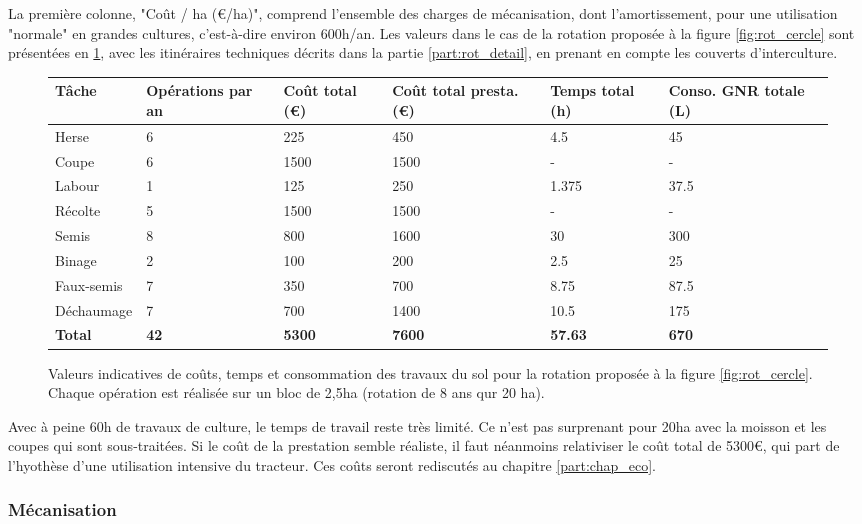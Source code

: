 \documentclass{book}
\begin{document}
La première colonne, "Coût / ha (\euro{}/ha)", comprend l'ensemble des charges de mécanisation, dont l'amortissement, pour une utilisation "normale" en grandes cultures, c'est-à-dire environ 600h/an. Les valeurs dans le cas de la rotation proposée à la figure \ref{fig:rot_cercle} sont présentées en \ref{tab:W_sol2}, avec les itinéraires techniques décrits dans la partie \ref{part:rot_detail}, en prenant en compte les couverts d'interculture.

\begin{figure}[h!]
\footnotesize
\center
\begin{tabular}{ | p{} | p{}| p{2cm}| p{2cm} | p{} | p{} | }
\hline
	Tâche & Opérations par an & Coût total (\euro{}) & Coût total presta. (\euro{}) & Temps total (h) & Conso. GNR totale (L) \\ \hline
	Herse & 6 & 225 & 450 & 4.5 & 45 \\ \hline
	Coupe & 6 & 1500 & 1500 & - & - \\ \hline
	Labour & 1 & 125 & 250 & 1.375 & 37.5 \\ \hline
	Récolte & 5 & 1500 & 1500 & - & - \\ \hline
	Semis & 8 & 800 & 1600 & 30 & 300 \\ \hline
	Binage & 2 & 100 & 200 & 2.5 & 25 \\ \hline
	Faux-semis & 7 & 350 & 700 & 8.75 & 87.5 \\ \hline
	Déchaumage & 7 & 700 & 1400 & 10.5 & 175 \\ \hline
	\textbf{Total} & \textbf{42} & \textbf{5300} & \textbf{7600} & \textbf{57.63} & \textbf{670} \\ \hline
\end{tabular}
\caption{Valeurs indicatives de coûts, temps et consommation des travaux du sol pour la rotation proposée à la figure \ref{fig:rot_cercle}. Chaque opération est réalisée sur un bloc de 2,5ha (rotation de 8 ans qur 20 ha).}
\label{tab:W_sol2}
\end{figure}

Avec à peine 60h de travaux de culture, le temps de travail reste très limité. Ce n'est pas surprenant pour 20ha avec la moisson et les coupes qui sont sous-traitées. Si le coût de la prestation semble réaliste, il faut néanmoins relativiser le coût total de 5300\euro{}, qui part de l'hyothèse d'une utilisation intensive du tracteur. Ces coûts seront rediscutés au chapitre \ref{part:chap_eco}.

\subsubsection{Mécanisation}
\end{document}
